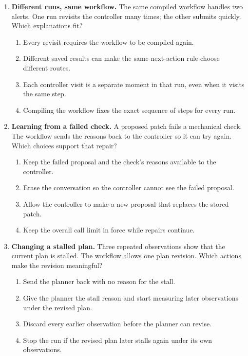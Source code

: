 \begin{enumerate}[start=21,itemsep=0.7\baselineskip]
\item\label{exercise:24} \begin{minipage}[t]{\linewidth}
\textbf{Different runs, same workflow.} The same compiled workflow handles two alerts. One run revisits the controller many times; the other submits quickly. Which explanations fit?
\begin{enumerate}[label=\textnormal{(\Alph*)},leftmargin=*,itemsep=0pt]
\item Every revisit requires the workflow to be compiled again.
\item Different saved results can make the same next-action rule choose different routes.
\item Each controller visit is a separate moment in that run, even when it visits the same step.
\item Compiling the workflow fixes the exact sequence of steps for every run.
\end{enumerate}
\end{minipage}

\item\label{exercise:25} \begin{minipage}[t]{\linewidth}
\textbf{Learning from a failed check.} A proposed patch fails a mechanical check. The workflow sends the reasons back to the controller so it can try again. Which choices support that repair?
\begin{enumerate}[label=\textnormal{(\Alph*)},leftmargin=*,itemsep=0pt]
\item Keep the failed proposal and the check's reasons available to the controller.
\item Erase the conversation so the controller cannot see the failed proposal.
\item Allow the controller to make a new proposal that replaces the stored patch.
\item Keep the overall call limit in force while repairs continue.
\end{enumerate}
\end{minipage}

\item\label{exercise:26} \begin{minipage}[t]{\linewidth}
\textbf{Changing a stalled plan.} Three repeated observations show that the current plan is stalled. The workflow allows one plan revision. Which actions make the revision meaningful?
\begin{enumerate}[label=\textnormal{(\Alph*)},leftmargin=*,itemsep=0pt]
\item Send the planner back with no reason for the stall.
\item Give the planner the stall reason and start measuring later observations under the revised plan.
\item Discard every earlier observation before the planner can revise.
\item Stop the run if the revised plan later stalls again under its own observations.
\end{enumerate}
\end{minipage}


\end{enumerate}
